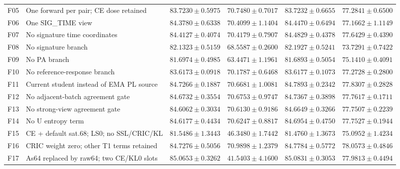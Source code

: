 \begin{table}[t]
\begin{tabular}{lp{}rrrr}
F05 & One forward per pair; CE dose retained & $83.7230\pm0.5975$ & $70.7480\pm0.7017$ & $83.7232\pm0.6655$ & $77.2841\pm0.6500$ \\

F06 & One SIG\_TIME view & $84.3780\pm0.6338$ & $70.4099\pm1.1404$ & $84.4470\pm0.6494$ & $77.1662\pm1.1149$ \\

F07 & No signature time coordinates & $84.4127\pm0.4074$ & $70.4179\pm0.7907$ & $84.4829\pm0.4378$ & $77.6429\pm0.4390$ \\

F08 & No signature branch & $82.1323\pm0.5159$ & $68.5587\pm0.2600$ & $82.1927\pm0.5241$ & $73.7291\pm0.7422$ \\

F09 & No PA branch & $81.6974\pm0.4985$ & $63.4471\pm1.1961$ & $81.6893\pm0.5054$ & $75.1410\pm0.4091$ \\

F10 & No reference-response branch & $83.6173\pm0.0918$ & $70.1787\pm0.6468$ & $83.6177\pm0.1073$ & $77.2728\pm0.2800$ \\

F11 & Current student instead of EMA PL source & $84.7266\pm0.1887$ & $70.6681\pm1.0081$ & $84.7893\pm0.2342$ & $77.8307\pm0.2828$ \\

F12 & No adjacent-batch agreement gate & $84.6732\pm0.3554$ & $70.6753\pm0.9747$ & $84.7367\pm0.3898$ & $77.7617\pm0.1711$ \\

F13 & No strong-view agreement gate & $84.6062\pm0.3034$ & $70.6130\pm0.9186$ & $84.6649\pm0.3266$ & $77.7507\pm0.2239$ \\

F14 & No U entropy term & $84.6177\pm0.4434$ & $70.6247\pm0.8817$ & $84.6954\pm0.4750$ & $77.7527\pm0.1944$ \\

F15 & CE + default sat.68; LS0; no SSL/CRIC/KL & $81.5486\pm1.3443$ & $46.3480\pm1.7442$ & $81.4760\pm1.3673$ & $75.0952\pm1.4234$ \\

F16 & CRIC weight zero; other T1 terms retained & $84.7276\pm0.5056$ & $70.9898\pm1.2379$ & $84.7784\pm0.5772$ & $78.0573\pm0.4846$ \\

F17 & As64 replaced by raw64; two CE/KL0 slots & $85.0653\pm0.3262$ & $41.5403\pm4.1600$ & $85.0831\pm0.3053$ & $77.9813\pm0.4494$ \\


\end{tabular}
\end{table}
